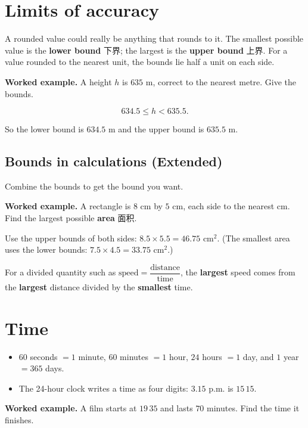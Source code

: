 \documentclass[11pt]{article}
\begin{document}
\section*{Limits of accuracy}

A rounded value could really be anything that rounds to it. The smallest possible value is the \textbf{lower bound} 下界; the largest is the \textbf{upper bound} 上界. For a value rounded to the nearest unit, the bounds lie half a unit on each side.

\textbf{Worked example.} A height $h$ is $635\text{ m}$, correct to the nearest metre. Give the bounds.

\[
634.5 \leqslant h < 635.5.
\]

So the lower bound is $634.5\text{ m}$ and the upper bound is $635.5\text{ m}$.

\subsection*{Bounds in calculations (Extended)}

Combine the bounds to get the bound you want.

\textbf{Worked example.} A rectangle is $8\text{ cm}$ by $5\text{ cm}$, each side to the nearest cm. Find the largest possible \textbf{area} 面积.

Use the upper bounds of both sides: $8.5 \times 5.5 = 46.75\text{ cm}^{2}$. (The smallest area uses the lower bounds: $7.5 \times 4.5 = 33.75\text{ cm}^{2}$.)

For a divided quantity such as $\text{speed} = \dfrac{\text{distance}}{\text{time}}$, the \textbf{largest} speed comes from the \textbf{largest} distance divided by the \textbf{smallest} time.

\section*{Time}

\begin{itemize}
\item $60$ seconds $= 1$ minute, $60$ minutes $= 1$ hour, $24$ hours $= 1$ day, and $1$ year $= 365$ days.

\item The 24-hour clock writes a time as four digits: $3.15$ p.m. is $15\,15$.

\end{itemize}

\textbf{Worked example.} A film starts at $19\,35$ and lasts $70$ minutes. Find the time it finishes.
\end{document}
